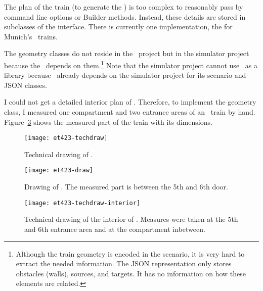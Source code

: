 The plan of the train (to generate \eg the \sbahn) is too complex to reasonably
pass by command line options or Builder methods.
Instead, these details are stored in subclasses of the 
interface.
There is currently one implementation, the  for Munich's
\sbahn\ trains.

The geometry classes do not reside in the \traingen\ project but in the
simulator project because the \seatingmodel\ depends on them.\footnote{Although
  the train geometry is encoded in the scenario, it is very hard to extract the
  needed information.
  The \acs{JSON} representation only stores obstacles (walls), sources, and
  targets.
  It has no information on how these elements are related.}
Note that the simulator project cannot use \traingen\ as a library because
\traingen\ already depends on the simulator project for its scenario and
\acs{JSON} classes.

I could not get a detailed interior plan of \sbahntype.
Therefore, to implement the geometry class, I measured one compartment and two
entrance areas of an \sbahntype\ train by hand.
Figure~\ref{fig:et423-techdraw-interior} shows the measured part of the train
with its dimensions.

\begin{figure}[htb]
  \centering
  \texttt{[image: et423-techdraw]}
  \caption[Technical drawing of \sbahntype.]%
  {Technical drawing of \sbahntype.
    }
  \label{fig:et423-techdraw}
\end{figure}

\begin{figure}[htb]
  \centering
  \texttt{[image: et423-draw]}
  \caption[Drawing of \sbahntype.]%
  {Drawing of \sbahntype. The measured part is between the 5th and 6th door.
    }
  \label{fig:et423-draw}
\end{figure}

\begin{figure}[htb]
  \centering
  \texttt{[image: et423-techdraw-interior]}
  \caption[Technical drawing of the interior of \sbahntype.]%
  {Technical drawing of the interior of \sbahntype.
    Measures were taken at the 5th and 6th entrance area and at the compartment
    inbetween.}
  \label{fig:et423-techdraw-interior}
\end{figure}

